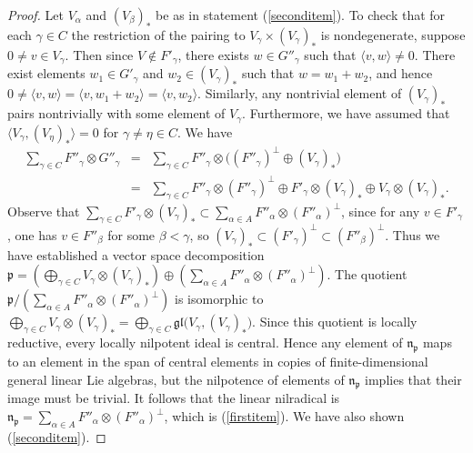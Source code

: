 \documentclass{article}
\def\gl{\mathfrak {gl}}
\def\n{\mathfrak {n}}
\def\p{\mathfrak {p}}
\begin{document}
\begin{proof}
Let $V_\alpha$ and $(V_\beta)_*$ be as in statement (\ref{seconditem}).  To check that for each $\gamma \in C$ the restriction of the pairing to $V_\gamma \times (V_\gamma)_*$ is nondegenerate, suppose $0 \neq v \in V_\gamma$.  Then since $V \notin F'_\gamma$, there exists $w \in G''_\gamma$ such that $\langle v , w \rangle \neq 0$.  There exist elements $w_1 \in G'_\gamma$ and $w_2 \in (V_\gamma)_*$ such that $w = w_1 + w_2$, and hence $0 \neq \langle v , w \rangle = \langle v , w_1 + w_2  \rangle = \langle v , w_2 \rangle$.  Similarly, any nontrivial element of $(V_\gamma)_*$ pairs nontrivially with some element of $V_\gamma$.  Furthermore, we have assumed that $\langle V_\gamma , (V_\eta)_* \rangle = 0$ for $\gamma \neq \eta \in C$.  We have 
\begin{eqnarray*}
\sum_{\gamma \in C} F''_\gamma \otimes G''_\gamma &= &  \sum_{\gamma \in C} F''_\gamma \otimes \big((F''_\gamma)^\perp \oplus (V_\gamma)_* \big)  \\
& = & \sum_{\gamma \in C}  F''_\gamma \otimes (F''_\gamma)^\perp \oplus F'_\gamma \otimes (V_\gamma)_* \oplus V_\gamma \otimes (V_\gamma)_*.
\end{eqnarray*}
Observe that $\sum_{\gamma \in C} F'_\gamma \otimes (V_\gamma)_* \subset \sum_{\alpha \in A} F''_\alpha \otimes (F''_\alpha)^\perp$, since for any $v \in F'_\gamma$, one has $v \in F''_\beta$ for some $\beta < \gamma$, so $(V_\gamma)_* \subset (F'_\gamma)^\perp \subset (F''_\beta)^\perp$.  Thus we have established a vector space decomposition $\p = (\bigoplus_{\gamma \in C} V_\gamma \otimes (V_\gamma)_*) \oplus (\sum_{\alpha \in A} F''_\alpha \otimes (F''_\alpha)^\perp)$.  The quotient ${\p} / {(\sum_{\alpha \in A} F''_\alpha \otimes (F''_\alpha)^\perp)}$ is isomorphic to $\bigoplus_{\gamma \in C} V_\gamma \otimes (V_\gamma)_* = \bigoplus_{\gamma \in C} \gl \big( V_\gamma, (V_\gamma)_* \big)$.  Since this quotient is locally reductive, every locally nilpotent ideal is central.
Hence any element of $\n_\p$ maps to an element in the span of central elements in copies of finite-dimensional general linear Lie algebras, but the nilpotence of elements of $\n_\p$ implies that their image must be trivial.  
 It follows that the linear nilradical is $\n_\p = \sum_{\alpha \in A} F''_\alpha \otimes (F''_\alpha)^\perp$, which is (\ref{firstitem}).  We have also shown (\ref{seconditem}).


\end{proof}
\end{document}
